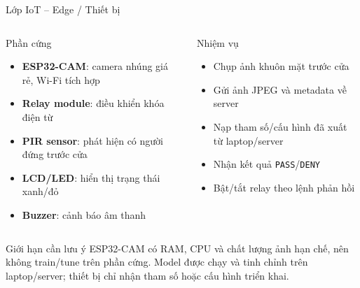 \documentclass[aspectratio=169]{beamer}
\begin{document}
\begin{frame}{Lớp IoT -- Edge / Thiết bị}
  \begin{columns}[T]
      \begin{block}{Phần cứng}
        \begin{itemize}
          \item \textbf{ESP32-CAM}: camera nhúng giá rẻ, Wi-Fi tích hợp
          \item \textbf{Relay module}: điều khiển khóa điện từ
          \item \textbf{PIR sensor}: phát hiện có người đứng trước cửa
          \item \textbf{LCD/LED}: hiển thị trạng thái xanh/đỏ
          \item \textbf{Buzzer}: cảnh báo âm thanh
        \end{itemize}
      \end{block}

      \begin{block}{Nhiệm vụ}
        \begin{itemize}
          \item Chụp ảnh khuôn mặt trước cửa
          \item Gửi ảnh JPEG và metadata về server
          \item Nạp tham số/cấu hình đã xuất từ laptop/server
          \item Nhận kết quả \texttt{PASS}/\texttt{DENY}
          \item Bật/tắt relay theo lệnh phản hồi
        \end{itemize}
      \end{block}
  \end{columns}

  \vspace{0.4em}
  \begin{alertblock}{Giới hạn cần lưu ý}
    \small
    ESP32-CAM có RAM, CPU và chất lượng ảnh hạn chế, nên không train/tune trên phần cứng. Model được chạy và tinh chỉnh trên laptop/server; thiết bị chỉ nhận tham số hoặc cấu hình triển khai.
  \end{alertblock}
\end{frame}
\end{document}
